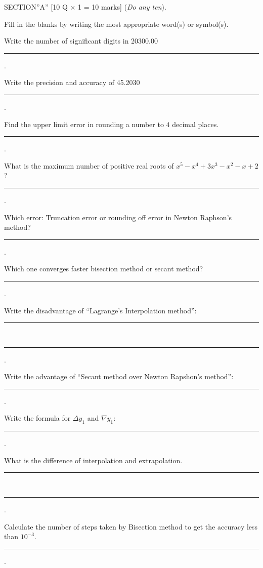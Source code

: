 \documentclass[12pt]{exam}
\begin{document}
\begin{center}
  SECTION''A'' \hspace{5mm} [10 Q \(\times\) 1 = 10 marks] (\textit{Do any ten}).
\end{center}
Fill in the blanks by writing the most appropriate word(s) or symbol(s).
\begin{questions}

\question Write the number of significant digits in 20300.00  \rule{5cm}{0.15mm}.
  \vspace{2mm}

  \question Write the precision and accuracy of 45.2030  \rule{5cm}{0.15mm}.

  \question Find the upper limit error in rounding a number to $4$ decimal places.\rule{4cm}{0.15mm}.

    \question What is the maximum number of positive real roots of $x^5-x^4+3x^3-x^2-x+2$? \rule{7cm}{0.15mm}.

    \question Which error: Truncation error or rounding off error in Newton Raphson's method? \rule{5cm}{0.15mm}.

    \question Which one converges faster bisection method or secant method? \rule{5cm}{0.15mm}.

    \question Write the disadvantage of ``Lagrange's Interpolation method'': \rule{5cm}{0.15mm} \\[1mm]
      \rule{10cm}{0.15mm}.

    \question Write the advantage of ``Secant method over Newton Rapshon's method'': \\[1mm]
      \rule{12cm}{0.15mm}.

    \question Write the formula for $\Delta y_1$ and $\nabla y_1$: \rule{7cm}{0.15mm}.

    \question What is the difference of interpolation and extrapolation. \rule{5cm}{0.15mm} \\[1mm]
      \rule{12cm}{0.15mm}.

 \question Calculate the number of steps taken by Bisection method to get the accuracy less than $10^{-3}$.\rule{8cm}{0.15mm}.
\end{questions}
\end{document}
